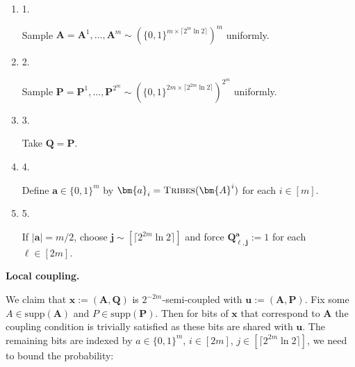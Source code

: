 \documentclass[10pt,a4paper]{article}
\begin{document}
\begin{enumerate}


\item[] 
1. 


Sample $\bm{A}=\bm{A}^{1},\dots,\bm{A}^{m}\sim(\{0,1\}^{m\times\lceil 2^{m}\ln 2\rceil})^{m}$ uniformly.\par





\item[] 
2. 


Sample $\bm{P}=\bm{P}^{1},\dots,\bm{P}^{2^{m}}\sim(\{0,1\}^{2m\times\lceil 2^{2m}\ln 2\rceil})^{2^{m}}$ uniformly.\par





\item[] 
3. 


Take $\bm{Q}=\bm{P}$.\par





\item[] 
4. 


Define $\bm{a}\in\{0,1\}^{m}$ by $\bm{a}_{i}=\textsc{Tribes}(\bm{A}^{i})$ for each $i\in[m]$.\par





\item[] 
5. 


If $|\bm{a}|=m/2$, choose $\bm{j}\sim[\lceil 2^{2m}\ln 2\rceil]$ and force $\bm{Q}^{\bm{a}}_{\ell,\bm{j}}:=1$ for each $\ell\in[2m]$.\par





\end{enumerate}





\par\medskip\noindent\textbf{Local coupling.}\par




We claim that $\bm{x}:=(\bm{A},\bm{Q})$ is $2^{-2m}$-semi-coupled with $\bm{u}:=(\bm{A},\bm{P})$.
Fix some $A\in\mathrm{supp}(\bm{A})$ and $P\in\mathrm{supp}(\bm{P})$. Then for bits of $\bm{x}$ that correspond to $\bm{A}$ the coupling condition is trivially satisfied as these bits are shared with $\bm{u}$. The remaining bits are indexed by $a\in\{0,1\}^{m}$, $i\in[2m]$, $j\in[\lceil 2^{2m}\ln 2\rceil]$, we need to bound the probability:\par
\end{document}
